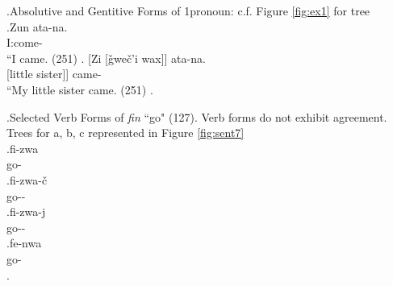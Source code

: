 \ex.\label{sent:ex1}Absolutive and Gentitive Forms of 1\Sg[] pronoun: c.f. Figure \ref{fig:ex1} for tree \\ 
    \ag.Zun ata-na. \\
        I:\Abs[] come-\Aori[] \\
        ``I came. (251)
    \bg. [Zi [\v{g}we\v{c}'i wax]] ata-na. \\
        [I:\Gen[] [little sister]] came-\Aori[] \\
        ``My little sister came. (251)
    \z.

\ex.\label{sent:ex7}Selected Verb Forms of \textit{fin} ``go" (127). Verb forms do not exhibit agreement. Trees for a, b, c represented in Figure \ref{fig:sent7} \\
    \ag.fi-zwa \\
    go-\Impf[] \\
    \bg.fi-zwa-\v{c} \\
    go-\Impf[]-\Neg[] \\
    \cg.fi-zwa-j \\
    go-\Impf[]-\Pst[] \\
    \dg.fe-nwa \\
    go-\Prf[] \\
    \z.

